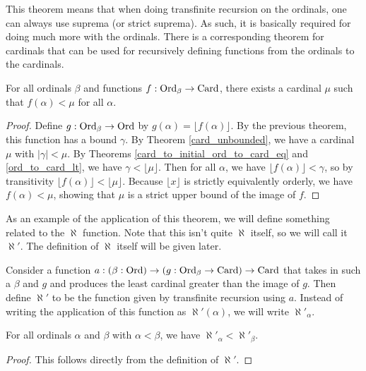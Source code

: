 \documentclass[../../math.tex]{subfiles}
\begin{document}
This theorem means that when doing transfinite recursion on the ordinals, one
can always use suprema (or strict suprema).  As such, it is basically required
for doing much more with the ordinals.  There is a corresponding theorem for
cardinals that can be used for recursively defining functions from the ordinals
to the cardinals.

\begin{theorem} \label{ord_card_large}
    For all ordinals $\beta$ and functions $f : \operatorname{Ord}_\beta \to \operatorname{Card}$, there
    exists a cardinal $\mu$ such that $f(\alpha) < \mu$ for all $\alpha$.
\end{theorem}
\begin{proof}
    Define $g : \operatorname{Ord}_\beta \to \operatorname{Ord}$ by $g(\alpha) = \lfloor f(\alpha) \rfloor$.
    By the previous theorem, this function has a bound $\gamma$.  By Theorem
    \ref{card_unbounded}, we have a cardinal $\mu$ with $|\gamma| < \mu$.  By
    Theorems \ref{card_to_initial_ord_to_card_eq} and \ref{ord_to_card_lt}, we
    have $\gamma < \lfloor \mu \rfloor$.  Then for all $\alpha$, we have
    $\lfloor f(\alpha) \rfloor < \gamma$, so by transitivity $\lfloor f(\alpha)
    \rfloor < \lfloor \mu \rfloor$.  Because $\lfloor x \rfloor$ is strictly
    equivalently orderly, we have $f(\alpha) < \mu$, showing that $\mu$ is a
    strict upper bound of the image of $f$.
\end{proof}

As an example of the application of this theorem, we will define something
related to the $\aleph$ function.  Note that this isn't quite $\aleph$ itself,
so we will call it $\aleph'$.  The definition of $\aleph$ itself will be given
later.

\begin{definition}
    Consider a function $a : (\beta : \operatorname{Ord}) \to (g : \operatorname{Ord}_\beta \to \operatorname{Card}) \to
    \operatorname{Card}$ that takes in such a $\beta$ and $g$ and produces the least cardinal
    greater than the image of $g$.  Then define $\aleph'$ to be the function
    given by transfinite recursion using $a$.  Instead of writing the
    application of this function as $\aleph'(\alpha)$, we will write
    $\aleph'_\alpha$.
\end{definition}

\begin{theorem} \label{aleph'_gt}
    For all ordinals $\alpha$ and $\beta$ with $\alpha < \beta$, we have
    $\aleph'_\alpha < \aleph'_\beta$.
\end{theorem}
\begin{proof}
    This follows directly from the definition of $\aleph'$.
\end{proof}
\end{document}
